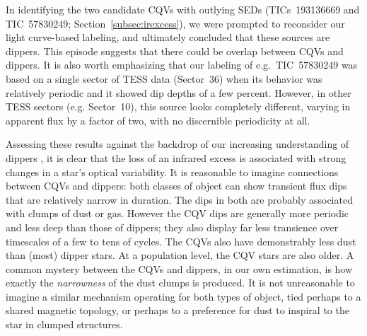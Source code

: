 \documentclass[11pt,twocolumn,tighten]{aastex63}
\begin{document}
In identifying the two candidate CQVs with outlying SEDs
(TICs~193136669 and TIC~57830249; Section~\ref{subsec:irexcess}), we
were prompted to reconsider our light curve-based labeling, and
ultimately concluded that these sources are dippers.  This episode
suggests that there could be overlap between CQVs and dippers.  It is
also worth emphasizing that our labeling of e.g.~TIC~57830249 was
based on a single sector of TESS data (Sector~36) when its behavior
was relatively periodic and it showed dip depths of a few percent.
However, in other TESS sectors (e.g. Sector~10), this source looks
completely different, varying in apparent flux by a factor of two,
with no discernible periodicity at all.

Assessing these results against the backdrop of our increasing
understanding of dippers
\citep[e.g.][]{2014AJ....147...82C,2016ApJ...816...69A,2021ApJ...908...16R,2022ApJS..263...14C,2022MNRAS.514.1386G},
it is clear that the loss of an infrared excess is associated with
strong changes in a star's optical variability.  It is reasonable to
imagine connections between CQVs and dippers: both classes of object
can show transient flux dips that are relatively narrow in duration.
The dips in both are probably associated with clumps of dust or gas.
However the CQV dips are generally more periodic and less deep than
those of dippers; they also display far less transience over
timescales of a few to tens of cycles.  The CQVs also have
demonstrably less dust than (most) dipper stars.  At a population
level, the CQV stars are also older.  A common mystery between the
CQVs and dippers, in our own estimation, is how exactly the {\it
narrowness} of the dust clumps is produced.  It is not unreasonable to
imagine a similar mechanism operating for both types of object, tied
perhaps to a shared magnetic topology, or perhaps to a preference for
dust to inspiral to the star in clumped structures.
\end{document}

